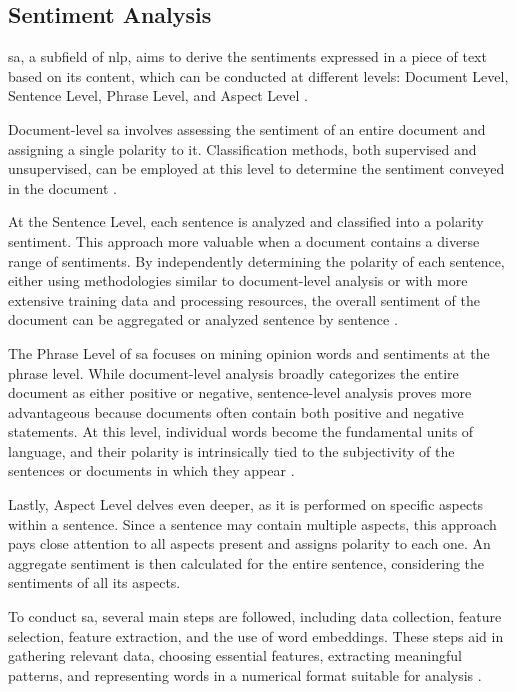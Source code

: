 \documentclass[a4paper,fleqn]{cas-sc}
\begin{document}
\subsection{Sentiment Analysis}

\gls{sa}, a subfield of \gls{nlp}, aims to derive the sentiments expressed in a piece of text based on its content, which can be conducted at different levels: Document Level, Sentence Level, Phrase Level, and Aspect Level  \cite{kaur_survey_2017, wankhade_survey_2022}.

Document-level \gls{sa} involves assessing the sentiment of an entire document and assigning a single polarity to it. Classification methods, both supervised and unsupervised, can be employed at this level to determine the sentiment conveyed in the document \cite{wankhade_survey_2022}.

At the Sentence Level, each sentence is analyzed and classified into a polarity sentiment. This approach more valuable when a document contains a diverse range of sentiments. By independently determining the polarity of each sentence, either using methodologies similar to document-level analysis or with more extensive training data and processing resources, the overall sentiment of the document can be aggregated or analyzed sentence by sentence  \cite{wankhade_survey_2022}.

The Phrase Level of \gls{sa} focuses on mining opinion words and sentiments at the phrase level. While document-level analysis broadly categorizes the entire document as either positive or negative, sentence-level analysis proves more advantageous because documents often contain both positive and negative statements. At this level, individual words become the fundamental units of language, and their polarity is intrinsically tied to the subjectivity of the sentences or documents in which they appear \cite{wankhade_survey_2022}.

Lastly, Aspect Level delves even deeper, as it is performed on specific aspects within a sentence. Since a sentence may contain multiple aspects, this approach pays close attention to all aspects present and assigns polarity to each one. An aggregate sentiment is then calculated for the entire sentence, considering the sentiments of all its aspects.

To conduct \gls{sa}, several main steps are followed, including data collection, feature selection, feature extraction, and the use of word embeddings. These steps aid in gathering relevant data, choosing essential features, extracting meaningful patterns, and representing words in a numerical format suitable for analysis  \cite{kaur_survey_2017}.
\end{document}
